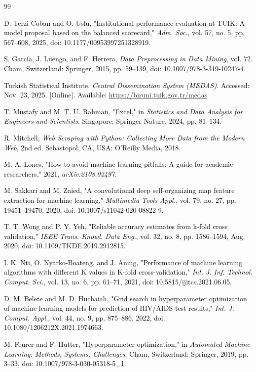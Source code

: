 \documentclass[final, 9pt, twocolumn]{saucis}
\newcommand{\rev}[1]{\textcolor{black}{#1}}
\begin{document}
\begin{thebibliography}{99}

 \rev{D. Terzi Coban and O. Uslu, "Institutional performance evaluation at TUIK: A model proposal based on the balanced scorecard," \emph{Adm. Soc.}, vol. 57, no. 5, pp. 567--608, 2025, doi: 10.1177/00953997251328919.}

 \rev{S. García, J. Luengo, and F. Herrera, \emph{Data Preprocessing in Data Mining}, vol. 72. Cham, Switzerland: Springer, 2015, pp. 59--139, doi: 10.1007/978-3-319-10247-4.}

 \rev{Turkish Statistical Institute. \emph{Central Dissemination System (MEDAS)}. Accessed: Nov. 23, 2025. [Online]. Available: \url{https://biruni.tuik.gov.tr/medas}}

 \rev{T. Mustafy and M. T. U. Rahman, "Excel," in \emph{Statistics and Data Analysis for Engineers and Scientists}. Singapore: Springer Nature, 2024, pp. 81--134.}

 \rev{R. Mitchell, \emph{Web Scraping with Python: Collecting More Data from the Modern Web}, 2nd ed. Sebastopol, CA, USA: O'Reilly Media, 2018.}

 \rev{M. A. Lones, "How to avoid machine learning pitfalls: A guide for academic researchers," 2021, \emph{arXiv:2108.02497}.}

 \rev{M. Sakkari and M. Zaied, "A convolutional deep self-organizing map feature extraction for machine learning," \emph{Multimedia Tools Appl.}, vol. 79, no. 27, pp. 19451--19470, 2020, doi: 10.1007/s11042-020-08822-9.}

 \rev{T. T. Wong and P. Y. Yeh, "Reliable accuracy estimates from k-fold cross validation," \emph{IEEE Trans. Knowl. Data Eng.}, vol. 32, no. 8, pp. 1586--1594, Aug. 2020, doi: 10.1109/TKDE.2019.2912815.}

 \rev{I. K. Nti, O. Nyarko-Boateng, and J. Aning, "Performance of machine learning algorithms with different K values in K-fold cross-validation," \emph{Int. J. Inf. Technol. Comput. Sci.}, vol. 13, no. 6, pp. 61--71, 2021, doi: 10.5815/ijitcs.2021.06.05.}

 \rev{D. M. Belete and M. D. Huchaiah, "Grid search in hyperparameter optimization of machine learning models for prediction of HIV/AIDS test results," \emph{Int. J. Comput. Appl.}, vol. 44, no. 9, pp. 875--886, 2022, doi: 10.1080/1206212X.2021.1974663.}

 \rev{M. Feurer and F. Hutter, "Hyperparameter optimization," in \emph{Automated Machine Learning: Methods, Systems, Challenges}. Cham, Switzerland: Springer, 2019, pp. 3--33, doi: 10.1007/978-3-030-05318-5\_1.}


\end{thebibliography}
\end{document}
